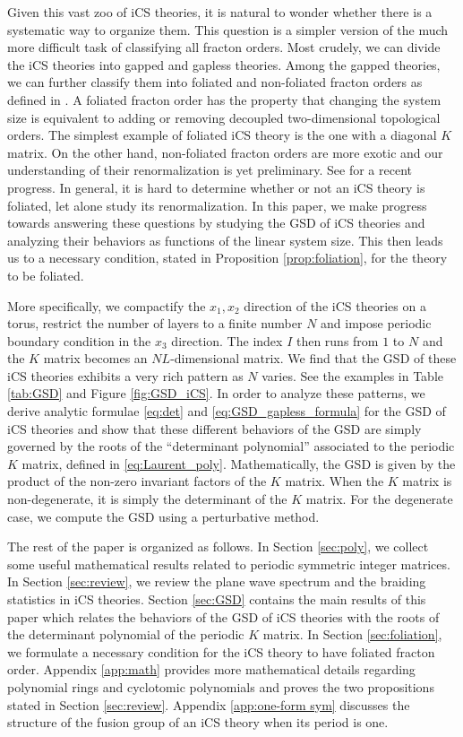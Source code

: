 \documentclass[aps,prb,twocolumn,superscriptaddress,floatfix,10pt,nofootinbib]{revtex4-2}
\theoremstyle{definition}
\begin{document}
Given this vast zoo of iCS theories, it is natural to wonder whether there is a systematic way to organize them. This question is a simpler version of the much more difficult task of classifying all fracton orders. Most crudely, we can divide the iCS theories into gapped and gapless theories. Among the gapped theories, we can further classify them into foliated and non-foliated fracton orders as defined in \cite{Shirley:2017suz}. A foliated fracton order has the property that changing the system size is equivalent to adding or removing decoupled two-dimensional topological orders. The simplest example of foliated iCS theory is the one with a diagonal $K$ matrix. On the other hand, non-foliated fracton orders are more exotic and our understanding of their renormalization is yet preliminary. See \cite{wang2022renormalization} for a recent progress. In general, it is hard to determine whether or not an iCS theory is foliated, let alone study its renormalization. In this paper, we make progress towards answering these questions by studying the GSD of iCS theories and analyzing their behaviors as functions of the linear system size. This then leads us to a necessary condition, stated in Proposition \ref{prop:foliation}, for the theory to be foliated.

More specifically, we compactify the $x_1,x_2$ direction of the iCS theories on a torus, restrict the number of layers to a finite number $N$ and impose periodic boundary condition in the $x_3$ direction. The index $I$ then runs from $1$ to $N$ and the $K$ matrix becomes an $NL$-dimensional matrix. We find that the GSD of these iCS theories exhibits a very rich pattern as $N$ varies. See the examples in Table \ref{tab:GSD} and Figure \ref{fig:GSD_iCS}. In order to analyze these patterns, we derive analytic formulae \eqref{eq:det} and \eqref{eq:GSD_gapless_formula} for the GSD of iCS theories and show that these different behaviors of the GSD are simply governed by the roots of the ``determinant polynomial'' associated to the periodic $K$ matrix, defined in \eqref{eq:Laurent_poly}. Mathematically, the GSD is given by the product of the non-zero invariant factors of the $K$ matrix. When the $K$ matrix is non-degenerate, it is simply the determinant of the $K$ matrix. For the degenerate case, we compute the GSD using a perturbative method.

The rest of the paper is organized as follows. In Section \ref{sec:poly}, we collect some useful mathematical results related to periodic symmetric integer matrices. In Section \ref{sec:review}, we review the plane wave spectrum and the braiding statistics in iCS theories. Section \ref{sec:GSD} contains the main results of this paper which relates the behaviors of the GSD of iCS theories with the roots of the determinant polynomial of the periodic $K$ matrix. In Section \ref{sec:foliation}, we formulate a necessary condition for the iCS theory to have foliated fracton order. Appendix \ref{app:math} provides more mathematical details regarding polynomial rings and cyclotomic polynomials and proves the two propositions stated in Section \ref{sec:review}. Appendix \ref{app:one-form sym} discusses the structure of the fusion group of an iCS theory when its period is one.
\end{document}
